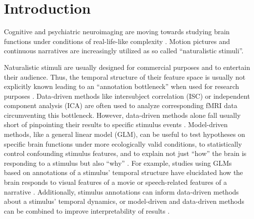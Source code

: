 \documentclass[10pt,a4paper,onecolumn]{article}
\begin{document}
\listoftodos

\clearpage

\section*{Introduction}
Cognitive and psychiatric neuroimaging are moving towards studying brain
functions under conditions of real-life-like complexity
\citep{sonkusare2019naturalistic, eickhoff2020towards}. Motion pictures
\citep{hasson2008neurocinematics} and continuous narratives \citep{honey2012not,
lerner2011topographic} are increasingly utilized as so called ``naturalistic
stimuli''.

Naturalistic stimuli are usually designed for commercial purposes and to
entertain their audience. Thus, the temporal structure of their feature space is
usually not explicitly known leading to an ``annotation bottleneck'' when used
for research purposes \citep{aliko2020naturalistic}.
Data-driven methods like intersubject correlation
(ISC)\citep{hasson2004intersubject} or independent component analysis
(ICA)\citep{bartels2004chronoarchitecture} are often used to analyze
corresponding fMRI data circumventing this bottleneck. However, data-driven
methods alone fall usually short of pinpointing their results to specific
stimulus events \citep{kauttonen2015optimizing}.
Model-driven methods, like a general linear model (GLM), can be useful to test
hypotheses on specific brain functions under more ecologically valid conditions,
to statistically control confounding stimulus features, and to explain not just
``how'' the brain is responding to a stimulus but also ``why''
\citep{hamilton2018revolution}.
For example, studies using GLMs based on annotations of a stimulus' temporal
structure have elucidated how the brain responds to visual features of a movie
\citep{bartels2004mapping} or speech-related features of a narrative
\citep{rocca2019language}.
Additionally, stimulus annotations can inform data-driven methods about a
stimulus' temporal dynamics, or model-driven and data-driven methods can be
combined to improve interpretability of results \citep{lahnakoski2012stimulus}.
\end{document}
